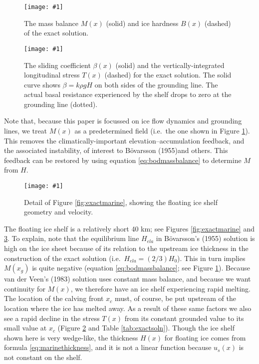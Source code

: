 \documentclass[review,letterpaper]{igs}
\renewcommand{\dh}{\fontencoding{T1}\selectfont{\symbol{240}}}
\newcommand{\onecol}[1]{\texttt{[image: \#1]}}
\newcommand{\bod}{B\"o\dh varsson\xspace}
\newcommand{\citebod}{B\"o\dh varsson (1955)\nocite{Bodvardsson}}
\begin{document}
\begin{figure}[ht]
\onecol{exactmarine-M-B}
\caption{The mass balance $M(x)$ (solid) and ice hardness $B(x)$ (dashed) of the exact solution.} \label{fig:exactMB}
\end{figure}

\begin{figure}[ht]
\onecol{exactmarine-beta-T}
\caption{The sliding coefficient $\beta(x)$ (solid) and the vertically-integrated longitudinal stress $T(x)$ (dashed) for the exact solution.  The solid curve shows $\beta = k \rho g H$ on both sides of the grounding line.  The actual basal resistance experienced by the shelf drops to zero at the grounding line (dotted).} \label{fig:exactbetaT}
\end{figure}

Note that, because this paper is focussed on ice flow dynamics and grounding lines, we treat $M(x)$ as a predetermined field (i.e.~the one shown in Figure \ref{fig:exactMB}).  This removes the climatically-important elevation--accumulation feedback, and the associated instability, of interest to \citebod and others.  This feedback can be restored by using equation \eqref{eq:bodmassbalance} to determine $M$ from $H$.

\begin{figure}[ht]
\onecol{exactmarine-geometry-detail}
\caption{Detail of Figure \ref{fig:exactmarine}, showing the floating ice shelf geometry and velocity.} \label{fig:exactmarine-detail}
\end{figure}

The floating ice shelf is a relatively short 40 km; see Figures \ref{fig:exactmarine} and \ref{fig:exactmarine-detail}.  To explain, note that the equilibrium line $H_{ela}$ in \bod's (1955) solution is high on the ice sheet because of its relation to the upstream ice thickness in the construction of the exact solution (i.e.~$H_{ela} = (2/3) H_0$).  This in turn implies $M(x_g)$ is quite negative (equation \eqref{eq:bodmassbalance}; see Figure \ref{fig:exactMB}).  Because van der Veen's (1983) solution uses constant mass balance, and because we want continuity for $M(x)$, we therefore have an ice shelf experiencing rapid melting.  The location of the calving front $x_c$ must, of course, be put upstream of the location where the ice has melted away.  As a result of these same factors we also see a rapid decline in the stress $T(x)$ from its constant grounded value to its small value at $x_c$ (Figure \ref{fig:exactbetaT} and Table \ref{tab:exactsoln}).  Though the ice shelf shown here is very wedge-like, the thickness $H(x)$ for floating ice comes from formula \eqref{eq:marinethickness}, and it is not a linear function because $u_s(x)$ is not constant on the shelf.
\end{document}
